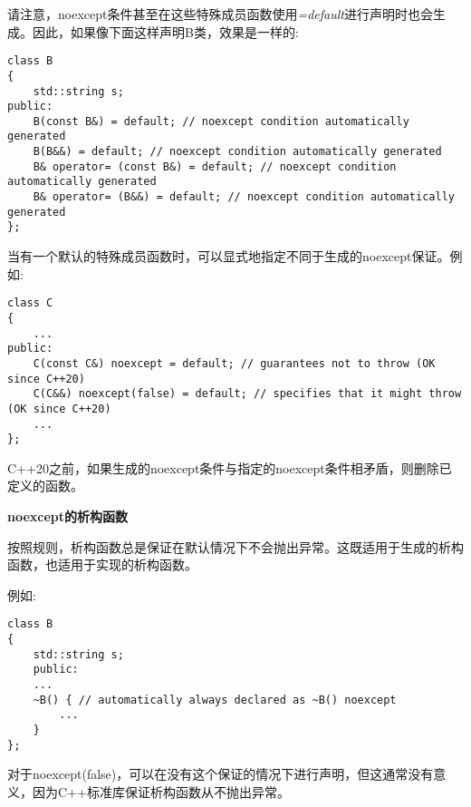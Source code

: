 请注意，noexcept条件甚至在这些特殊成员函数使用\textit{=default}进行声明时也会生成。因此，如果像下面这样声明B类，效果是一样的:\par

\begin{lstlisting}[caption={}]
class B
{
	std::string s;
public:
	B(const B&) = default; // noexcept condition automatically generated
	B(B&&) = default; // noexcept condition automatically generated
	B& operator= (const B&) = default; // noexcept condition automatically generated
	B& operator= (B&&) = default; // noexcept condition automatically generated
};
\end{lstlisting}

当有一个默认的特殊成员函数时，可以显式地指定不同于生成的noexcept保证。例如:\par

\begin{lstlisting}[caption={}]
class C
{
	...
public:
	C(const C&) noexcept = default; // guarantees not to throw (OK since C++20)
	C(C&&) noexcept(false) = default; // specifies that it might throw (OK since C++20)
	...
};
\end{lstlisting}

C++20之前，如果生成的noexcept条件与指定的noexcept条件相矛盾，则删除已定义的函数。\par

\hspace*{\fill} \par %
\textbf{noexcept的析构函数}

按照规则，析构函数总是保证在默认情况下不会抛出异常。这既适用于生成的析构函数，也适用于实现的析构函数。\par

例如:\par

\begin{lstlisting}[caption={}]
class B
{
	std::string s;
	public:
	...
	~B() { // automatically always declared as ~B() noexcept
		...
	}
};
\end{lstlisting}

对于noexcept(false)，可以在没有这个保证的情况下进行声明，但这通常没有意义，因为C++标准库保证析构函数从不抛出异常。\par


































